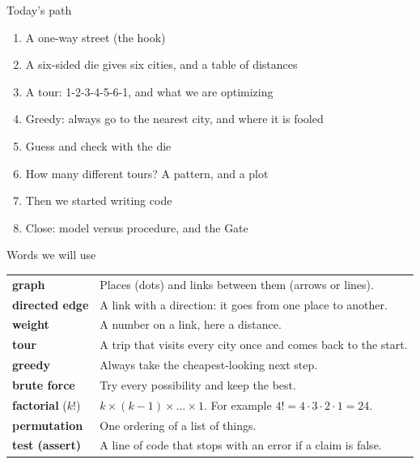 \begin{frame}{Today's path}
\begin{enumerate}
\item A one-way street (the hook)
\item A six-sided die gives six cities, and a table of distances
\item A tour: 1-2-3-4-5-6-1, and what we are optimizing
\item Greedy: always go to the nearest city, and where it is fooled
\item Guess and check with the die
\item How many different tours? A pattern, and a plot
\item Then we started writing code
\item Close: model versus procedure, and the Gate
\end{enumerate}
\end{frame}

\begin{frame}{Words we will use}
\begin{tabular}{@{}p{3.1cm}p{9.8cm}@{}}
\textbf{graph} & Places (dots) and links between them (arrows or lines).\\[2pt]
\textbf{directed edge} & A link with a direction: it goes from one place to another.\\[2pt]
\textbf{weight} & A number on a link, here a distance.\\[2pt]
\textbf{tour} & A trip that visits every city once and comes back to the start.\\[2pt]
\textbf{greedy} & Always take the cheapest-looking next step.\\[2pt]
\textbf{brute force} & Try every possibility and keep the best.\\[2pt]
\textbf{factorial} ($k!$) & $k\times(k-1)\times\dots\times1$. For example $4!=4\cdot3\cdot2\cdot1=24$.\\[2pt]
\textbf{permutation} & One ordering of a list of things.\\[2pt]
\textbf{test (assert)} & A line of code that stops with an error if a claim is false.\\
\end{tabular}
\end{frame}
